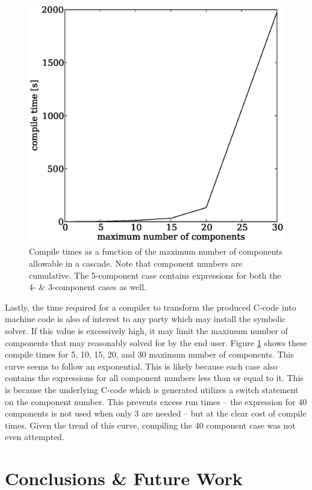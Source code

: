 \documentclass[preprint,12pt]{elsarticle}
\begin{document}
\begin{figure}[htpb]
\begin{center}
\includegraphics[scale=0.5]{compile_times.eps}
\caption{Compile times as a function of the maximum number of components allowable
    in a cascade.  Note that component numbers are cumulative.  The 5-component case 
    contains expressions for both the 4- \& 3-component cases as well.}
\label{compile_times_fig}
\end{center}
\end{figure}

Lastly, the time required for a compiler to transform the produced C-code into 
machine code is also of interest to any party which may install the symbolic solver.
If this value is excessively high, it may limit the maximum number of components
that may reasonably solved for by the end user.  Figure \ref{compile_times_fig}
shows these compile times for 5, 10, 15, 20, and 30 maximum number of components.
This curve seems to follow an exponential.  This is likely because each case also 
contains the expressions for all component numbers less than or equal to it.  This 
is because the underlying C-code which is generated utilizes a switch statement
on the component number.  This prevents excess run times -- the expression for 40 
components is not used when only 3 are needed -- but at the clear cost of compile
times.  Given the trend of this curve, compiling the 40 component 
case was not even attempted.


\section{Conclusions \& Future Work}
\label{sec:conc}


\end{document}
